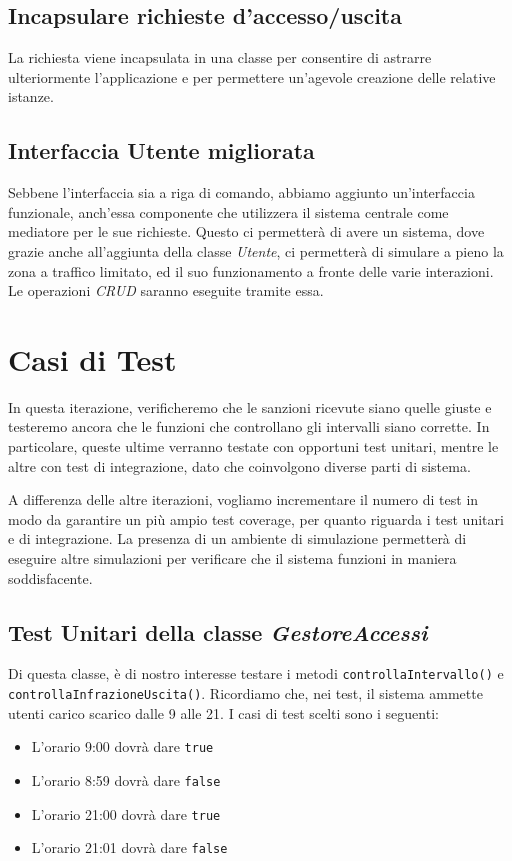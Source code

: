 \documentclass[12pt, letterpaper]{article}
\begin{document}
\subsection{Incapsulare richieste d'accesso/uscita}
La richiesta viene incapsulata in una classe 
per consentire di astrarre ulteriormente 
l'applicazione e per permettere un'agevole 
creazione delle relative istanze.

\subsection{Interfaccia Utente migliorata}
Sebbene l'interfaccia sia a riga di comando,
abbiamo aggiunto un'interfaccia funzionale, anch'essa 
componente che utilizzera il sistema centrale come mediatore 
per le sue richieste. Questo ci permetterà di avere un 
sistema, dove grazie anche all'aggiunta della classe 
\emph{Utente}, ci permetterà di simulare a pieno la zona 
a traffico limitato, ed il suo funzionamento a fronte 
delle varie interazioni. Le operazioni \emph{CRUD} 
saranno eseguite tramite essa.

\section{Casi di Test}
In questa iterazione, verificheremo
che le sanzioni ricevute siano quelle giuste 
e testeremo ancora che le funzioni che controllano 
gli intervalli siano corrette. In particolare,
queste ultime verranno testate con opportuni test 
unitari, mentre le altre con test di integrazione,
dato che coinvolgono diverse parti di sistema.

\noindent
A differenza delle altre iterazioni, vogliamo 
incrementare il numero di test in modo da 
garantire un più ampio test coverage, per quanto 
riguarda i test unitari e di integrazione.
La presenza di un ambiente di simulazione
permetterà di eseguire altre simulazioni per 
verificare che il sistema funzioni in maniera 
soddisfacente.

\subsection{Test Unitari della classe \emph{GestoreAccessi}}
Di questa classe, è di nostro interesse testare i metodi 
\texttt{controllaIntervallo()} e 
\texttt{controllaInfrazioneUscita()}. Ricordiamo che,
nei test, il sistema ammette utenti carico scarico dalle 
9 alle 21.
I casi di test scelti sono i seguenti:
\begin{itemize}
    \item L'orario 9:00 dovrà dare \texttt{true}
    \item L'orario 8:59 dovrà dare \texttt{false}
    \item L'orario 21:00 dovrà dare \texttt{true}
    \item L'orario 21:01 dovrà dare \texttt{false}
\end{itemize}
\end{document}
